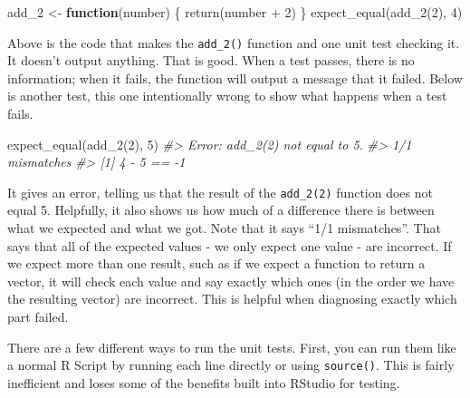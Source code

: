 \documentclass[
]{krantz}
\makeatletter
\newenvironment{Shaded}{\begin{snugshade}}{\end{snugshade}}
\newcommand{\CommentTok}[1]{\textcolor[rgb]{0.37,0.37,0.37}{\textit{#1}}}
\newcommand{\ControlFlowTok}[1]{\textcolor[rgb]{0.27,0.27,0.27}{\textbf{#1}}}
\newcommand{\DecValTok}[1]{\textcolor[rgb]{0.06,0.06,0.06}{#1}}
\newcommand{\FunctionTok}[1]{\textcolor[rgb]{0,0,0}{#1}}
\newcommand{\NormalTok}[1]{#1}
\newcommand{\OtherTok}[1]{\textcolor[rgb]{0.37,0.37,0.37}{#1}}
\newcommand{\SpecialCharTok}[1]{\textcolor[rgb]{0,0,0}{#1}}
\newenvironment{kframe}{%
\medskip{}
\setlength{\fboxsep}{.8em}
 \def\at@end@of@kframe{}%
 \ifinner\ifhmode%
  \def\at@end@of@kframe{\end{minipage}}%
  \begin{minipage}{\columnwidth}%
 \fi\fi%
 \def\FrameCommand##1{\hskip\@totalleftmargin \hskip-\fboxsep
 \colorbox{shadecolor}{##1}\hskip-\fboxsep
     \hskip-\linewidth \hskip-\@totalleftmargin \hskip\columnwidth}%
 \MakeFramed {\advance\hsize-\width
   \@totalleftmargin\z@ \linewidth\hsize
   \@setminipage}}%
 {\par\unskip\endMakeFramed%
 \at@end@of@kframe}
\renewenvironment{Shaded}{\begin{kframe}}{\end{kframe}}
\makeatother
\begin{document}
\begin{Shaded}
\begin{Highlighting}[]
\NormalTok{add\_2 }\OtherTok{\textless{}{-}} \ControlFlowTok{function}\NormalTok{(number) \{}
  \FunctionTok{return}\NormalTok{(number }\SpecialCharTok{+} \DecValTok{2}\NormalTok{)}
\NormalTok{\}}
\FunctionTok{expect\_equal}\NormalTok{(}\FunctionTok{add\_2}\NormalTok{(}\DecValTok{2}\NormalTok{), }\DecValTok{4}\NormalTok{)}
\end{Highlighting}
\end{Shaded}

Above is the code that makes the \texttt{add\_2()} function and one unit test checking it. It doesn't output anything. That is good. When a test passes, there is no information; when it fails, the function will output a message that it failed. Below is another test, this one intentionally wrong to show what happens when a test fails.

\begin{Shaded}
\begin{Highlighting}[]
\FunctionTok{expect\_equal}\NormalTok{(}\FunctionTok{add\_2}\NormalTok{(}\DecValTok{2}\NormalTok{), }\DecValTok{5}\NormalTok{)}
\CommentTok{\#\textgreater{} Error: add\_2(2) not equal to 5.}
\CommentTok{\#\textgreater{} 1/1 mismatches}
\CommentTok{\#\textgreater{} [1] 4 {-} 5 == {-}1}
\end{Highlighting}
\end{Shaded}

It gives an error, telling us that the result of the \texttt{add\_2(2)} function does not equal 5. Helpfully, it also shows us how much of a difference there is between what we expected and what we got. Note that it says ``1/1 mismatches''. That says that all of the expected values - we only expect one value - are incorrect. If we expect more than one result, such as if we expect a function to return a vector, it will check each value and say exactly which ones (in the order we have the resulting vector) are incorrect. This is helpful when diagnosing exactly which part failed.

There are a few different ways to run the unit tests. First, you can run them like a normal R Script by running each line directly or using \texttt{source()}. This is fairly inefficient and loses some of the benefits built into RStudio for testing.
\end{document}
